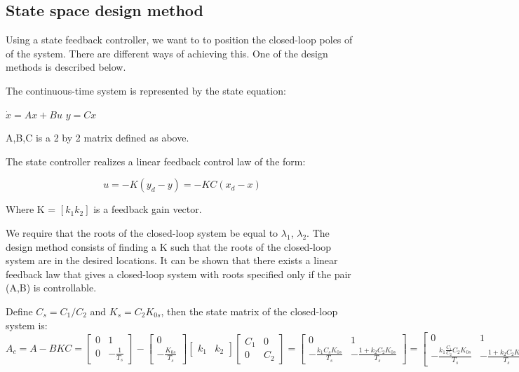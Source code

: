 \documentclass[11pt,a4paper]{article}
\begin{document}
\subsection{State space design method} \label{method}
Using a state feedback controller, we want to to position the closed-loop poles of of the system. There are different ways of achieving this. One of the design methods is described below.

The continuous-time system is represented by the state equation:

$\dot{x} = Ax + Bu$
$y = Cx$

A,B,C is a 2 by 2 matrix defined as above.

The state controller realizes a linear feedback control law of the form:

\begin{equation}
u = -K(y_{d}-y) = -KC(x_{d} - x)
\end{equation}

Where K = $[k_{1} k_{2}]$ is a feedback gain vector.

We require that the roots of the closed-loop system be equal to $\lambda_{1}$, $\lambda_{2}$. The design method consists of finding a K such that the roots of the closed-loop system are in the desired locations. It can be shown that there exists a linear feedback law that gives a closed-loop system with roots specified only if the pair (A,B) is controllable.

Define $C_{s}=C_{1}/C_{2}$ and $K_{s}=C_{2}K_{0s}$, then the state matrix of the closed-loop system is:
$A_{c} = A-BKC = \left[\begin{matrix} 0 & 1 \\ 0 & -\frac{1}{T_{s}} \end{matrix}\right]-\left[\begin{matrix} 0 \\  -\frac{K_{0s}}{T_{s}} \end{matrix}\right]\left[\begin{matrix} k_{1} & k_{2} \end{matrix}\right]\left[\begin{matrix} C_{1} & 0 \\ 0 & C_{2} \end{matrix}\right] = \left[\begin{matrix} 0 & 1 \\ -\frac{k_{1}C_{s}K_{0s}}{T_{s}} & -\frac{1+k_{2}C_{2}K_{0s}}{T_{s}} \end{matrix} \right] = \left[\begin{matrix} 0 & 1 \\ -\frac{k_{1}\frac{C_{1}}{C_{2}}C_{2}K_{0s}}{T_{s}} & -\frac{1+k_{2}C_{2}K_{0s}}{T_{s}} \end{matrix} \right] = \left[\begin{matrix} 0 & 1 \\ -\frac{k_{1}C_{s}K_{s}}{T_{s}} & -\frac{1+k_{2}K_{s}}{T_{s}} \end{matrix} \right]$
\end{document}
